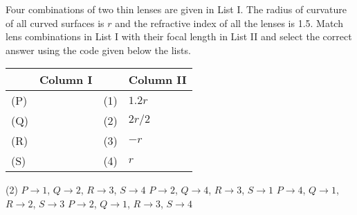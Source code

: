 
\item Four combinations of two thin lenses are given in List I. The radius of curvature of all curved surfaces is \( r \) and the refractive index of all the lenses is 1.5. Match lens combinations in List I with their focal length in List II and select the correct answer using the code given below the lists.

\begin{center}
\end{center}

\begin{center}
    \renewcommand{\arraystretch}{2}
    \begin{table}[h]
        \centering
        \begin{tabular}{p{0.25cm}p{8cm}|p{0.25cm}p{5cm}}
        \hline
        & Column I & & Column II \\
        \hline
        (P)& & (1)& \( 1.2r \)\\
        (Q)& & (2)& \( 2r/2 \)\\
        (R)& & (3)& \( -r \)\\
        (S)& & (4)& \( r \)\\
        \hline
        \end{tabular}
    \end{table}
\end{center}

\begin{tasks}(2)
    \task \( P \rightarrow 1 \), \( Q \rightarrow 2 \), \( R \rightarrow 3 \), \( S \rightarrow 4 \)
    \task \( P \rightarrow 2 \), \( Q \rightarrow 4 \), \( R \rightarrow 3 \), \( S \rightarrow 1 \)
    \task \( P \rightarrow 4 \), \( Q \rightarrow 1 \), \( R \rightarrow 2 \), \( S \rightarrow 3 \)
    \task \( P \rightarrow 2 \), \( Q \rightarrow 1 \), \( R \rightarrow 3 \), \( S \rightarrow 4 \)
\end{tasks}
